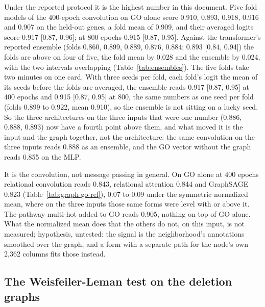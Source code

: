 

Under the reported protocol it is the highest number in this document. Five fold
models of the 400-epoch convolution on GO alone score 0.910, 0.893, 0.918, 0.916 and
0.907 on the held-out genes, a fold mean of 0.909, and their averaged logits score
0.917 [0.87, 0.96]; at 800 epochs 0.915 [0.87, 0.95]. Against the transformer's
reported ensemble (folds 0.860, 0.899, 0.889, 0.876, 0.884; 0.893 [0.84, 0.94]) the
folds are above on four of five, the fold mean by 0.028 and the ensemble by 0.024,
with the two intervals overlapping (Table~\ref{tab:ensembles}). The five folds take
two minutes on one card. With three seeds per fold, each fold's logit the mean of its
seeds before the folds are averaged, the ensemble reads 0.917 [0.87, 0.95] at 400
epochs and 0.915 [0.87, 0.95] at 800, the same numbers as one seed per fold (folds
0.899 to 0.922, mean 0.910), so the ensemble is not sitting on a lucky seed. So the
three architectures on the three inputs that were one
number (0.886, 0.888, 0.893) now have a fourth point above them, and what moved it is
the input and the graph together, not the architecture: the same convolution on the
three inputs reads 0.888 as an ensemble, and the GO vector without the graph reads
0.855 on the MLP.

It is the convolution, not message passing in general. On GO alone at 400 epochs
relational convolution reads 0.843, relational attention 0.844 and GraphSAGE 0.823
(Table~\ref{tab:graph-go-rel}), 0.07 to 0.09 under the symmetric-normalized mean, where
on the three inputs those same forms were level with or above it. The pathway
multi-hot added to GO reads 0.905, nothing on top of GO alone. What the normalized
mean does that the others do not, on this input, is not measured; hypothesis,
untested: the signal is the neighborhood's annotations smoothed over the graph, and a
form with a separate path for the node's own 2,362 columns fits those instead.



\subsection{The Weisfeiler-Leman test on the deletion graphs}

